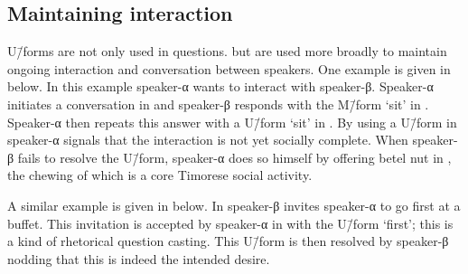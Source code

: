\subsection{Maintaining interaction}\label{sec:MaiInt}
U\=/forms are not only used in questions.
but are used more broadly to maintain
ongoing interaction and conversation between speakers.
One example is given in  below.
In this example speaker-α wants to interact with speaker-β.
Speaker-α initiates a conversation in  and
speaker-β responds with the M\=/form  `sit' in .
Speaker-α then repeats this answer with a U\=/form  `sit' in .
By using a U\=/form in  speaker-α
signals that the interaction is not yet socially complete.
When speaker-β fails to resolve the U\=/form,
speaker-α does so himself by offering betel nut
in , the chewing of which is
a core Timorese social activity.

\begin{exe}
	\label{ex:19/09/14 p.97}
		\begin{xlist}
			\label{ex:19/09/14 p.97-1}
			\label{ex:19/09/14 p.97-2}
			\label{ex:19/09/14 p.97-3}
			\label{ex:19/09/14 p.97-4}
		\end{xlist}
\end{exe}

A similar example is given in  below.
In  speaker-β
invites speaker-α to go first at a buffet.
This invitation is accepted by speaker-α
in  with the U\=/form  `first';
this is a kind of rhetorical question casting.
This U\=/form is then resolved by speaker-β
nodding that this is indeed the intended desire.

